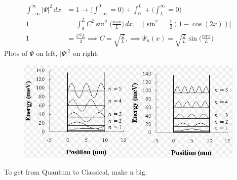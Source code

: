 \documentclass[a4paper, 11pt, normalem]{report}
\begin{document}
\begin{align}
    \int_{-\infty}^{\infty} |\Psi|^{2}\,dx &= 1 \rightarrow \Bigg(\int_{-\infty}^{0} = 0\Bigg) + \int_{0}^{L} + \Bigg(\int_{L}^{\infty} = 0\Bigg) \\
    1 &= \int_{0}^{L} C^{2}\sin^{2}\Big(\frac{n\pi x}{L}\Big)\,dx,\quad \Big[\sin^{2} = \frac{1}{2}(1 - \cos(2x))\Big] \\
    1 &= \frac{C^{2}L}{2} \implies C = \sqrt{\frac{2}{L}},\implies \Psi_{n}(x) = \sqrt{\frac{2}{L}}\sin\Big(\frac{n\pi x}{L}\Big)
\end{align}
Plots of $\Psi$ on left, $|\Psi|^{2}$ on right:
\begin{figure}[H]
    \centering
    \includegraphics[scale=0.9]{Squarez.jpg}
\end{figure}
To get from Quantum to Classical, make n big.
\end{document}
